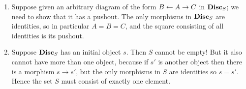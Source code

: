\documentclass[7Sketches]{subfiles}
\begin{document}
{
\begin{enumerate}
	\item Suppose given an arbitrary diagram of the form $B\leftarrow A\to C$ in $\mathbf{Disc}_S$; we need to show that it has a pushout. The only morphisms in $\mathbf{Disc}_S$ are identities, so in particular $A=B=C$, and the square consisting of all identities is its pushout.
	\item Suppose $\mathbf{Disc}_S$ has an initial object $s$. Then $S$ cannot be empty! But it also cannot have more than one object, because if $s'$ is another object then there is a morphism $s\to s'$, but the only morphisms in $S$ are identities so $s=s'$. Hence the set $S$ must consist of exactly one element.
\end{enumerate}
}
\end{document}
